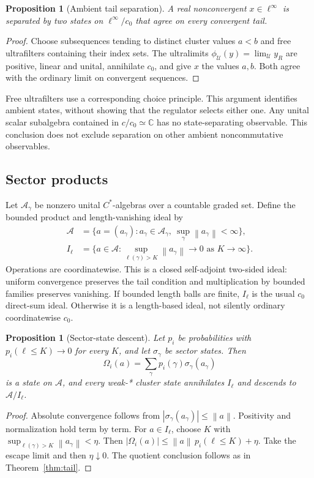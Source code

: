 \documentclass[11pt]{article}
\newtheorem{proposition}[theorem]{Proposition}
\theoremstyle{definition}
\newcommand{\C}{\mathbb C}
\newcommand{\A}{\mathcal A}
\newcommand{\norm}[1]{\left\lVert#1\right\rVert}
\begin{document}
\begin{proposition}[Ambient tail separation]
\label{prop:ultrafilter}
A real nonconvergent $x\in\ell^\infty$ is separated by two states on $\ell^\infty/c_0$ that agree on every convergent tail.
\end{proposition}
\begin{proof}
Choose subsequences tending to distinct cluster values $a<b$ and free ultrafilters containing their index sets.
The ultralimits $\phi_\mathcal U(y)=\lim_\mathcal U y_R$ are positive, linear and unital, annihilate $c_0$, and give $x$ the values $a,b$.
Both agree with the ordinary limit on convergent sequences.
\end{proof}

Free ultrafilters use a corresponding choice principle.
This argument identifies ambient states, without showing that the regulator selects either one.
Any unital scalar subalgebra contained in $c/c_0\simeq\C$ has no state-separating observable.
This conclusion does not exclude separation on other ambient noncommutative observables.

\subsection{Sector products}

Let $\A_\gamma$ be nonzero unital $C^*$-algebras over a countable graded set.
Define the bounded product and length-vanishing ideal by
\begin{align}
 \A&=\{a=(a_\gamma):a_\gamma\in\A_\gamma,
                     \ \sup_\gamma\norm{a_\gamma}<\infty\},\\
 I_\ell&=\{a\in\A:
       \sup_{\ell(\gamma)>K}\norm{a_\gamma}\to0
       \text{ as }K\to\infty\}.
 \label{eq:length-ideal}
\end{align}
Operations are coordinatewise.
This is a closed self-adjoint two-sided ideal: uniform convergence preserves the tail condition and multiplication by bounded families preserves vanishing.
If bounded length balls are finite, $I_\ell$ is the usual $c_0$ direct-sum ideal.
Otherwise it is a length-based ideal, not silently ordinary coordinatewise $c_0$.

\begin{proposition}[Sector-state descent]
\label{prop:sector}
Let $p_i$ be probabilities with $p_i(\ell\leq K)\to0$ for every $K$, and let $\sigma_\gamma$ be sector states.
Then
\begin{equation}
 \Omega_i(a)=\sum_\gamma p_i(\gamma)\sigma_\gamma(a_\gamma)
\end{equation}
is a state on $\A$, and every weak-* cluster state annihilates $I_\ell$ and descends to $\A/I_\ell$.
\end{proposition}
\begin{proof}
Absolute convergence follows from $|\sigma_\gamma(a_\gamma)|\leq\norm a$.
Positivity and normalization hold term by term.
For $a\in I_\ell$, choose $K$ with $\sup_{\ell(\gamma)>K}\norm{a_\gamma}<\eta$.
Then $|\Omega_i(a)|\leq\norm a\,p_i(\ell\leq K)+\eta$.
Take the escape limit and then $\eta\downarrow0$.
The quotient conclusion follows as in Theorem~\ref{thm:tail}.
\end{proof}
\end{document}
